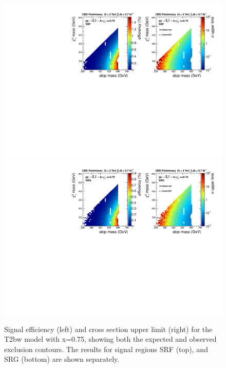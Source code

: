 \begin{figure}[hbt]
  \begin{center}
        \includegraphics[width=1.\linewidth]{plots/T2bw_x75_SRF.pdf}
        \includegraphics[width=1.\linewidth]{plots/T2bw_x75_SRG.pdf}
    \caption{Signal efficiency (left) and cross section upper limit
      (right) for the T2bw model with x=0.75, showing both the expected and
      observed exclusion contours. The results for signal regions SRF (top),
      and SRG (bottom) are shown separately.}
\label{fig:allsrlimits3T2bw0p75}
      \end{center}
\end{figure}

